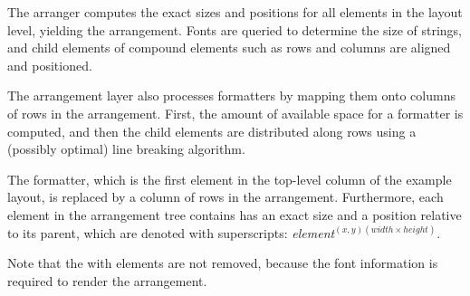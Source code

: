 The arranger computes the exact sizes and positions for all elements in the layout level, yielding the arrangement. Fonts are queried to determine the size of strings, and child elements of compound elements such as rows and columns are aligned and positioned.

The arrangement layer also processes formatters by mapping them onto columns of rows in the arrangement. First, the amount of available space for a formatter is computed, and then the child elements are distributed along rows using a (possibly optimal) line breaking algorithm.

 The formatter, which is the first element in the top-level column of the example layout, is replaced by a column of rows in the arrangement. Furthermore, each element in the arrangement tree contains has an exact size and a position relative to its parent, which are denoted with superscripts: {\em element}$^{(x,y)(width\times height)}$. 

Note that the with elements are not removed, because the font information is required to render the arrangement.
%
%
%

